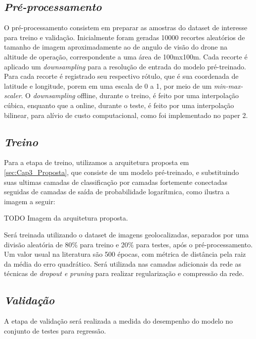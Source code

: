 \subsection{\textit{Pré-processamento}}\label{sec:Cap3_PreProcess}
O pré-processamento consistem em preparar as amostras do dataset de interesse para treino e validação. Inicialmente foram geradas 10000 recortes aleatórios de tamanho de imagem aproximadamente ao de angulo de visão do drone na altitude de operação, correspondente a uma área de 100mx100m. Cada recorte é aplicado um \textit{downsampling} para a resolução de entrada do modelo pré-treinado. Para cada recorte é registrado seu respectivo rótulo, que é sua coordenada de latitude e longitude, porem em uma escala de 0 a 1, por meio de um \textit{min-max-scaler}. O \textit{downsampling} offline, durante o treino, é feito por uma interpolação cúbica, enquanto que a online, durante o teste, é feito por uma interpolação bilinear, para alívio de custo computacional, como foi implementado no paper 2.

\subsection{\textit{Treino}}\label{sec:Cap3_Treino}
Para a etapa de treino, utilizamos a arquitetura proposta em \ref{sec:Cap3_Proposta}, que consiste de um modelo pré-treinado, e substituindo suas ultimas camadas de classificação por camadas fortemente conectadas seguidas de camadas de saída de probabilidade logarítmica, como ilustra a imagem a seguir:


TODO Imagem da arquitetura proposta.

Será treinada utilizando o dataset de imagens geolocalizadas, separados por uma divisão aleatória de 80\% para treino e 20\% para testes, após o pré-processamento. Um valor usual na literatura são 500 épocas, com métrica de distância pela raiz da média do erro quadrático. Será utilizada nas camadas adicionais da rede as técnicas de \textit{dropout e pruning} para realizar regularização e compressão da rede.




\subsection{\textit{Validação}}\label{sec:Cap3_Validacao}

A etapa de validação será realizada a medida do desempenho do modelo no conjunto de testes para regressão.




